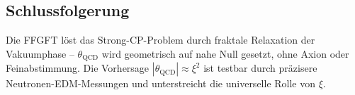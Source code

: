 	\subsection*{Schlussfolgerung}
	
	Die FFGFT löst das Strong-CP-Problem durch fraktale Relaxation der Vakuumphase – \(\theta_{\text{QCD}}\) wird geometrisch auf nahe Null gesetzt, ohne Axion oder Feinabstimmung. Die Vorhersage \(|\theta_{\text{QCD}}| \approx \xi^2\) ist testbar durch präzisere Neutronen-EDM-Messungen und unterstreicht die universelle Rolle von \(\xi\).



